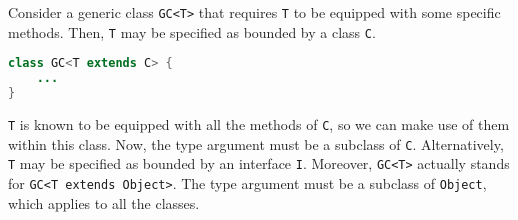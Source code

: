 \documentclass[a4paper, openany]{memoir}
\begin{document}
Consider a generic class \texttt{GC<T>} that requires \texttt{T} to be equipped with some specific methods. Then, \texttt{T} may be specified as bounded by a class \texttt{C}.
\begin{lstlisting}[language=Java]
class GC<T extends C> {
    ...
}
\end{lstlisting}
\texttt{T} is known to be equipped with all the methods of \texttt{C}, so we can make use of them within this class. Now, the type argument must be a subclass of \texttt{C}. Alternatively, \texttt{T} may be specified as bounded by an interface \texttt{I}. Moreover, \texttt{GC<T>} actually stands for \texttt{GC<T extends Object>}. The type argument must be a subclass of \texttt{Object}, which applies to all the classes.
\end{document}
